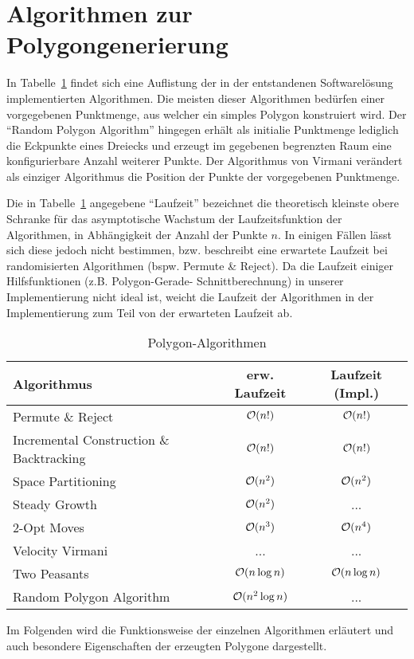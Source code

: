 \section{Algorithmen zur Polygongenerierung}

  In Tabelle~\ref{algo_table} findet sich eine Auflistung der in der
  entstandenen Softwarelösung implementierten Algorithmen. Die meisten dieser
  Algorithmen bedürfen einer vorgegebenen Punktmenge, aus welcher ein simples
  Polygon konstruiert wird. Der \enquote{Random Polygon Algorithm} hingegen
  erhält als initialie Punktmenge lediglich die Eckpunkte eines Dreiecks und
  erzeugt im gegebenen begrenzten Raum eine konfigurierbare Anzahl weiterer
  Punkte. Der Algorithmus von Virmani verändert als einziger Algorithmus die
  Position der Punkte der vorgegebenen Punktmenge.

  Die in Tabelle~\ref{algo_table} angegebene \enquote{Laufzeit} bezeichnet die
  theoretisch kleinste obere Schranke für das asymptotische Wachstum der
  Laufzeitsfunktion der Algorithmen, in Abhängigkeit der Anzahl der Punkte $n$.
  In einigen Fällen lässt sich diese jedoch nicht bestimmen, bzw. beschreibt
  eine erwartete Laufzeit bei randomisierten Algorithmen (bspw. Permute \&
  Reject). Da die Laufzeit einiger Hilfsfunktionen (z.B. Polygon-Gerade-
  Schnittberechnung) in unserer Implementierung nicht ideal ist, weicht die
  Laufzeit der Algorithmen in der Implementierung zum Teil von der erwarteten
  Laufzeit ab.

  \begin{table}[ht]
    \begin{center}
    \caption{Polygon-Algorithmen}
    \begin{tabular}{lcc} 
      \toprule
      Algorithmus & erw. Laufzeit & Laufzeit (Impl.) \\
      \midrule
      Permute \& Reject & $\mathcal{O}(n!)$ & $\mathcal{O}(n!)$ \\
      Incremental Construction \& Backtracking & $\mathcal{O}(n!)$ & $\mathcal{O}(n!)$ \\
      Space Partitioning & $\mathcal{O}(n^2)$ & $\mathcal{O}(n^2)$\\
      Steady Growth & $\mathcal{O}(n^2)$ & ... \\
      2-Opt Moves & $\mathcal{O}(n^3)$ & $\mathcal{O}(n^4)$ \\
      Velocity Virmani & ... & ...\\
      Two Peasants & $\mathcal{O}(n \log n)$ & $\mathcal{O}(n \log n)$ \\
      Random Polygon Algorithm & $\mathcal{O}(n^2 \log n)$ & ... \\
      \bottomrule
    \end{tabular}
    \label{algo_table}
    \end{center}
  \end{table}

  Im Folgenden wird die Funktionsweise der einzelnen Algorithmen erläutert und
  auch besondere Eigenschaften der erzeugten Polygone dargestellt.
